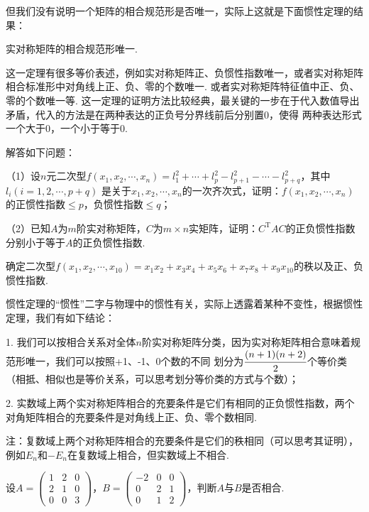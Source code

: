 但我们没有说明一个矩阵的相合规范形是否唯一，实际上这就是下面惯性定理的结果：
\begin{theorem}
	实对称矩阵的相合规范形唯一.
\end{theorem}
这一定理有很多等价表述，例如实对称矩阵正、负惯性指数唯一，或者实对称矩阵相合标准形中对角线上正、负、零的个数唯一.
或者实对称矩阵特征值中正、负、零的个数唯一等.
这一定理的证明方法比较经典，最关键的一步在于代入数值导出矛盾，代入的方法是在两种表达的正负号分界线前后分别置0，使得
两种表达形式一个大于0，一个小于等于0.
\begin{example}
	解答如下问题：

	\textup{（1）}设$n$元二次型$f(x_1,x_2,\cdots,x_n)=l_1^2+\cdots+l_p^2-l_{p+1}^2-\cdots-l_{p+q}^2$，其中$l_i(i=1,2,\cdots,p+q)$
	是关于$x_1,x_2,\cdots,x_n$的一次齐次式，证明：$f(x_1,x_2,\cdots,x_n)$的正惯性指数$\le p$，负惯性指数$\le q$\textup{；}
	
	\textup{（2）}已知$A$为$m$阶实对称矩阵，$C$为$m\times n$实矩阵，证明：$C^\mathrm{T}AC$的正负惯性指数
	分别小于等于$A$的正负惯性指数.
\end{example}
\begin{example}
	确定二次型$f(x_1,x_2,\cdots,x_{10})=x_1x_2+x_3x_4+x_5x_6+x_7x_8+x_9x_{10}$的秩以及正、负惯性指数.
\end{example}
惯性定理的“惯性”二字与物理中的惯性有关，实际上透露着某种不变性，根据惯性定理，我们有如下结论：

1. 我们可以按相合关系对全体$n$阶实对称矩阵分类，因为实对称矩阵相合意味着规范形唯一，我们可以按照+1、-1、0个数的不同
划分为$\cfrac{(n+1)(n+2)}{2}$个等价类（相抵、相似也是等价关系，可以思考划分等价类的方式与个数）；

2. 实数域上两个实对称矩阵相合的充要条件是它们有相同的正负惯性指数，两个对角矩阵相合的充要条件是对角线上正、负、零个数相同.

注：复数域上两个对称矩阵相合的充要条件是它们的秩相同（可以思考其证明），例如$E_n$和$-E_n$在复数域上相合，但实数域上不相合.
\begin{example}
	设$A=\begin{pmatrix}
		1 & 2 & 0 \\ 2 & 1 & 0 \\ 0 & 0 & 3
	\end{pmatrix}$，$B=\begin{pmatrix}
		-2 & 0 & 0 \\ 0 & 2 & 1 \\ 0 & 1 & 2
	\end{pmatrix}$，判断$A$与$B$是否相合.
\end{example}
